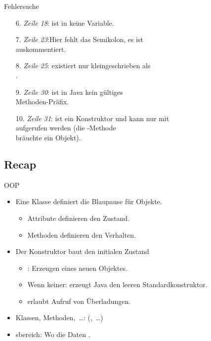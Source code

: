 {\begin{frame}[c]{Fehlersuche}
   \begin{enumerate}[<+(1)->]
      \itemsep9.25pt
      \item[6.] \textit{Zeile 18}:\quad {} ist in  keine Variable.
      \item[7.] \textit{Zeile 23}:\quad Hier fehlt das Semikolon, es ist\\\qquad auskommentiert.
      \item[8.] \textit{Zeile 25}:\quad {} existiert nur kleingeschrieben als\\\qquad{}.
      \item[9.] \textit{Zeile 30}:\quad {} ist in Java kein gültiges\\\qquad Methoden-Präfix.
      \item[10.] \textit{Zeile 31}:\quad {} ist ein Konstruktor und kann nur mit\\\qquad{} aufgerufen werden (die -Methode\\\qquad bräuchte ein Objekt).
   \end{enumerate}
\end{frame}
\SidebarReset

\subsection{Recap}
\begin{frame}[c]{\hfill OOP}
\begin{itemize}[<+(1)->]
   \itemsep18pt
   \item Eine Klasse definiert die Blaupause für Objekte. \begin{itemize}
      \item Attribute definieren den Zustand.
      \item Methoden definieren den Verhalten.
   \end{itemize}
   \item Der Konstruktor baut den initialen Zustand \begin{itemize}
      \item {}: Erzeugen eines neuen Objektes.
      \item Wenn keiner: erzeugt Java den leeren Standardkonstruktor.
      \item {} erlaubt Aufruf von Überladungen.
   \end{itemize}
   \item Klassen, Methoden,~\ldots:\hfill {}  (,~\ldots)
   \item {}sbereich: Wo die Daten .
\end{itemize}
\LargeSide
\end{frame}

}
